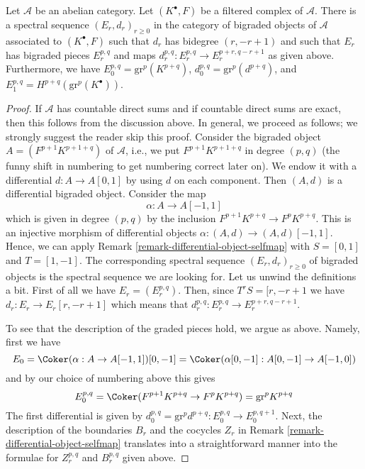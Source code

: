 \begin{lemma}
\label{lemma-spectral-sequence-filtered-complex}
Let $\mathcal{A}$ be an abelian category. Let $(K^\bullet, F)$ be a
filtered complex of $\mathcal{A}$. There is a spectral sequence
$(E_r, d_r)_{r \geq 0}$ in the category of bigraded objects of $\mathcal{A}$
associated to $(K^\bullet, F)$ such that $d_r$ has bidegree $(r, - r + 1)$
and such that $E_r$ has bigraded pieces $E_r^{p, q}$ and maps
$d_r^{p, q} : E_r^{p, q} \to E_r^{p + r, q - r + 1}$ as given above.
Furthermore, we have $E_0^{p, q} = \text{gr}^p(K^{p + q})$,
$d_0^{p, q} = \text{gr}^p(d^{p + q})$,
and $E_1^{p, q} = H^{p + q}(\text{gr}^p(K^\bullet))$.
\end{lemma}

\begin{proof}
If $\mathcal{A}$ has countable direct sums and if countable direct
sums are exact, then this follows from the discussion above.
In general, we proceed as follows; we strongly suggest the reader
skip this proof. Consider the bigraded object $A = (F^{p + 1}K^{p + 1 + q})$
of $\mathcal{A}$, i.e., we put $F^{p + 1}K^{p + 1 + q}$ in degree $(p, q)$
(the funny shift in numbering to get numbering correct later on).
We endow it with a differential $d : A \to A[0, 1]$ by using $d$
on each component. Then $(A, d)$ is a differential bigraded object.
Consider the map
$$
\alpha : A \to A[-1, 1]
$$
which is given in degree $(p, q)$ by the inclusion
$F^{p + 1}K^{p + q} \to F^pK^{p + q}$.
This is an injective morphism of differential objects
$\alpha : (A, d) \to (A, d)[-1, 1]$. Hence, we can apply
Remark \ref{remark-differential-object-selfmap}
with $S = [0, 1]$ and $T = [1, -1]$.
The corresponding spectral sequence $(E_r, d_r)_{r \geq 0}$
of bigraded objects is the spectral sequence we are looking
for. Let us unwind the definitions a bit. First of all we have
$E_r = (E_r^{p, q})$. Then, since $T^rS = [r, -r + 1$
we have $d_r : E_r \to E_r[r, -r + 1]$ which means that
$d_r^{p, q} : E_r^{p, q} \to E_r^{p + r, q - r + 1}$.

\medskip\noindent
To see that the description of the graded pieces hold, we argue
as above. Namely, first we have
$$
E_0 = \Coker(\alpha : A \to A[-1, 1])[0, -1] =
\Coker(\alpha[0, -1] : A[0, -1] \to A[-1, 0])
$$
and by our choice of numbering above this gives
$$
E_0^{p, q} = \Coker(F^{p + 1}K^{p + q} \to F^pK^{p + q}) = \text{gr}^pK^{p + q}
$$
The first differential is given by
$d_0^{p, q} = \text{gr}^pd^{p + q} : E_0^{p, q} \to E_0^{p, q + 1}$.
Next, the description of the boundaries $B_r$ and the cocycles $Z_r$
in Remark \ref{remark-differential-object-selfmap}
translates into a straightforward manner into the formulae
for $Z_r^{p, q}$ and $B_r^{p, q}$ given above.
\end{proof}

